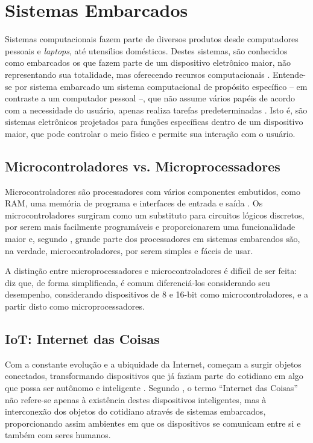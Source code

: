 \section{Sistemas Embarcados}
\label{sec:embarcados}
Sistemas computacionais fazem parte de diversos produtos desde computadores pessoais e \textit{laptops}, até utensílios domésticos. Destes sistemas, são conhecidos como embarcados os que fazem parte de um dispositivo eletrônico maior, não representando sua totalidade, mas oferecendo recursos computacionais \cite{vahid:2002}. Entende-se por sistema embarcado um sistema computacional de propósito específico -- em contraste a um computador pessoal --, que não assume vários papéis de acordo com a necessidade do usuário, apenas realiza tarefas predeterminadas \cite{heath:2002}. Isto é, são sistemas eletrônicos projetados para funções específicas dentro de um dispositivo maior, que pode controlar o meio físico e permite sua interação com o usuário.

\subsection{Microcontroladores vs. Microprocessadores}
Microcontroladores são processadores com vários componentes embutidos, como RAM, uma memória de programa e interfaces de entrada e saída \cite{white:2011}. Os microcontroladores surgiram como um substituto para circuitos lógicos discretos, por serem mais facilmente programáveis e proporcionarem uma funcionalidade maior \cite{heath:2002} e, segundo , grande parte dos processadores em sistemas embarcados são, na verdade, microcontroladores, por serem simples e fáceis de usar.

A distinção entre microprocessadores e microcontroladores é difícil de ser feita:  diz que, de forma simplificada, é comum diferenciá-los considerando seu desempenho, considerando dispositivos de 8 e 16-bit como microcontroladores, e a partir disto como microprocessadores.


\subsection{IoT: Internet das Coisas}
Com a constante evolução e a ubiquidade da Internet, começam a surgir objetos conectados, transformando dispositivos que já faziam parte do cotidiano em algo que possa ser autônomo e inteligente \cite{kopetz:2011}.  Segundo , o termo ``Internet das Coisas''  não refere-se apenas à existência destes dispositivos inteligentes, mas à interconexão dos objetos do cotidiano através de sistemas embarcados, proporcionando assim ambientes em que os dispositivos se comunicam entre si e também com seres humanos.

